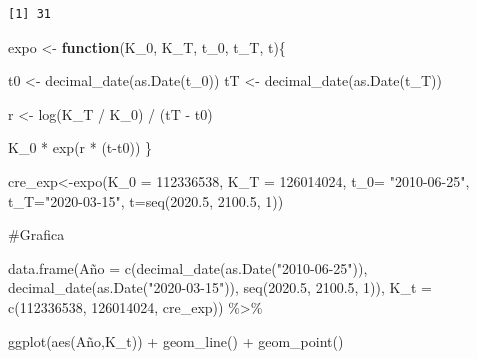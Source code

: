 \documentclass[
  letterpaper,
  DIV=11,
  numbers=noendperiod]{scrartcl}
\newenvironment{Shaded}{\begin{snugshade}}{\end{snugshade}}
\newcommand{\AttributeTok}[1]{\textcolor[rgb]{0.40,0.45,0.13}{#1}}
\newcommand{\CommentTok}[1]{\textcolor[rgb]{0.37,0.37,0.37}{#1}}
\newcommand{\ControlFlowTok}[1]{\textcolor[rgb]{0.00,0.23,0.31}{\textbf{#1}}}
\newcommand{\DecValTok}[1]{\textcolor[rgb]{0.68,0.00,0.00}{#1}}
\newcommand{\FloatTok}[1]{\textcolor[rgb]{0.68,0.00,0.00}{#1}}
\newcommand{\FunctionTok}[1]{\textcolor[rgb]{0.28,0.35,0.67}{#1}}
\newcommand{\NormalTok}[1]{\textcolor[rgb]{0.00,0.23,0.31}{#1}}
\newcommand{\OtherTok}[1]{\textcolor[rgb]{0.00,0.23,0.31}{#1}}
\newcommand{\SpecialCharTok}[1]{\textcolor[rgb]{0.37,0.37,0.37}{#1}}
\newcommand{\StringTok}[1]{\textcolor[rgb]{0.13,0.47,0.30}{#1}}
\begin{document}
\begin{verbatim}
[1] 31
\end{verbatim}

\begin{Shaded}
\begin{Highlighting}[]
\NormalTok{expo }\OtherTok{\textless{}{-}} \ControlFlowTok{function}\NormalTok{(K\_0, K\_T, t\_0, t\_T, t)\{}
  
\NormalTok{  t0 }\OtherTok{\textless{}{-}} \FunctionTok{decimal\_date}\NormalTok{(}\FunctionTok{as.Date}\NormalTok{(t\_0))}
\NormalTok{  tT }\OtherTok{\textless{}{-}} \FunctionTok{decimal\_date}\NormalTok{(}\FunctionTok{as.Date}\NormalTok{(t\_T))}
  
\NormalTok{  r }\OtherTok{\textless{}{-}} \FunctionTok{log}\NormalTok{(K\_T }\SpecialCharTok{/}\NormalTok{ K\_0) }\SpecialCharTok{/}\NormalTok{ (tT }\SpecialCharTok{{-}}\NormalTok{ t0)}
  
\NormalTok{  K\_0 }\SpecialCharTok{*} \FunctionTok{exp}\NormalTok{(r }\SpecialCharTok{*}\NormalTok{ (t}\SpecialCharTok{{-}}\NormalTok{t0))}
\NormalTok{\}}

\NormalTok{cre\_exp}\OtherTok{\textless{}{-}}\FunctionTok{expo}\NormalTok{(}\AttributeTok{K\_0 =} \DecValTok{112336538}\NormalTok{, }\AttributeTok{K\_T =} \DecValTok{126014024}\NormalTok{, }\AttributeTok{t\_0=} \StringTok{"2010{-}06{-}25"}\NormalTok{, }\AttributeTok{t\_T=}\StringTok{"2020{-}03{-}15"}\NormalTok{, }\AttributeTok{t=}\FunctionTok{seq}\NormalTok{(}\FloatTok{2020.5}\NormalTok{, }\FloatTok{2100.5}\NormalTok{, }\DecValTok{1}\NormalTok{))}
                
\CommentTok{\#Grafica}

\FunctionTok{data.frame}\NormalTok{(Año }\OtherTok{=} \FunctionTok{c}\NormalTok{(}\FunctionTok{decimal\_date}\NormalTok{(}\FunctionTok{as.Date}\NormalTok{(}\StringTok{"2010{-}06{-}25"}\NormalTok{)), }\FunctionTok{decimal\_date}\NormalTok{(}\FunctionTok{as.Date}\NormalTok{(}\StringTok{"2020{-}03{-}15"}\NormalTok{)), }\FunctionTok{seq}\NormalTok{(}\FloatTok{2020.5}\NormalTok{, }\FloatTok{2100.5}\NormalTok{, }\DecValTok{1}\NormalTok{)), }\AttributeTok{K\_t =} \FunctionTok{c}\NormalTok{(}\DecValTok{112336538}\NormalTok{, }\DecValTok{126014024}\NormalTok{, cre\_exp)) }\SpecialCharTok{\%\textgreater{}\%}
  
\FunctionTok{ggplot}\NormalTok{(}\FunctionTok{aes}\NormalTok{(Año,K\_t)) }\SpecialCharTok{+} \FunctionTok{geom\_line}\NormalTok{() }\SpecialCharTok{+} \FunctionTok{geom\_point}\NormalTok{()}
\end{Highlighting}
\end{Shaded}
\end{document}
